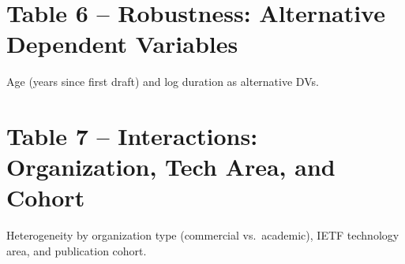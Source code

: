 \documentclass[12pt]{article}
\begin{document}
\vspace{1em}


\clearpage
\section{Table 6 -- Robustness: Alternative Dependent Variables}

Age (years since first draft) and log duration as alternative DVs.

\vspace{1em}


\clearpage
\section{Table 7 -- Interactions: Organization, Tech Area, and Cohort}

Heterogeneity by organization type (commercial vs.\ academic),
IETF technology area, and publication cohort.

\vspace{1em}

\end{document}
